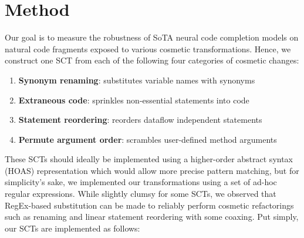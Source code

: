 \documentclass[usenames,dvipsnames]{article} %
\begin{document}


  \section{Method}\label{sec:method}

  Our goal is to measure the robustness of SoTA neural code completion models on natural code fragments exposed to various cosmetic transformations. Hence, we construct one SCT from each of the following four categories of cosmetic changes:

  \begin{enumerate}[itemsep=1ex]
    \item \textbf{Synonym renaming}: substitutes variable names with synonyms
    \item \textbf{Extraneous code}: sprinkles non-essential statements into code
    \item \textbf{Statement reordering}: reorders dataflow independent statements
    \item \textbf{Permute argument order}: scrambles user-defined method arguments
  \end{enumerate}

  These SCTs should ideally be implemented using a higher-order abstract syntax (HOAS) representation which would allow more precise pattern matching, but for simplicity's sake, we implemented our transformations using a set of ad-hoc regular expressions. While slightly clumsy for some SCTs, we observed that RegEx-based substitution can be made to reliably perform cosmetic refactorings such as renaming and linear statement reordering with some coaxing. Put simply, our SCTs are implemented as follows:
\end{document}
